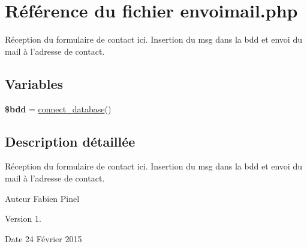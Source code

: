 \hypertarget{envoimail_8php}{\section{Référence du fichier envoimail.\-php}
\label{envoimail_8php}
}


Réception du formulaire de contact ici. Insertion du msg dans la bdd et envoi du mail à l'adresse de contact.  


\subsection*{Variables}
\begin{DoxyCompactItemize}
\item 
\hypertarget{envoimail_8php_a94f91e878bce0991e2cd595c5dd79b3f}{{\bfseries \$bdd} = \hyperlink{function_8php_a1f56f7efe8c1222675d8715c259957d5}{connect\-\_\-database}()}\label{envoimail_8php_a94f91e878bce0991e2cd595c5dd79b3f}

\end{DoxyCompactItemize}


\subsection{Description détaillée}
Réception du formulaire de contact ici. Insertion du msg dans la bdd et envoi du mail à l'adresse de contact. \begin{DoxyAuthor}{Auteur}
Fabien Pinel 
\end{DoxyAuthor}
\begin{DoxyVersion}{Version}
1. 
\end{DoxyVersion}
\begin{DoxyDate}{Date}
24 Février 2015 
\end{DoxyDate}
